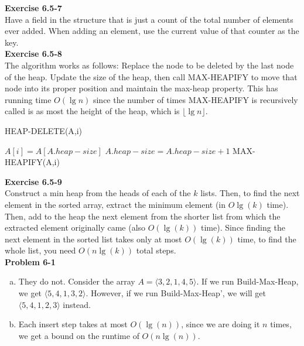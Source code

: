 \documentclass{article}
\begin{document}
\noindent\textbf{Exercise 6.5-7}\\

Have a field in the structure that is just a count of the total number of elements ever added. When adding an element, use the current value of that counter as the key.\\

\noindent\textbf{Exercise 6.5-8}\\

The algorithm works as follows:  Replace the node to be deleted by the last node of the heap.  Update the size of the heap, then call MAX-HEAPIFY to move that node into its proper position and maintain the max-heap property.  This has running time $O(\lg n)$ since the number of times MAX-HEAPIFY is recursively called is as most the height of the heap, which is $\lfloor \lg n \rfloor$.

\begin{algorithm}
\caption{HEAP-DELETE(A,i)}
\begin{algorithmic}[1]
\State $A[i] = A[A.heap-size]$ 
\State $A.heap-size = A.heap-size + 1$
\State MAX-HEAPIFY(A,i)
\end{algorithmic}
\end{algorithm}

\noindent\textbf{Exercise 6.5-9}\\

Construct a min heap from the heads of each of the $k$ lists. Then, to find the next element in the sorted array, extract the minimum element (in $O\lg(k)$ time). Then, add to the heap the next element from the shorter list from which the extracted element originally came (also $O(\lg(k))$ time). Since finding the next element in the sorted list takes only at most $O(\lg(k))$ time, to find the whole list, you need $O(n\lg(k))$ total steps. \\



\noindent\textbf{Problem 6-1}\\

\begin{enumerate}[a.]
\item
They do not. Consider the array $A =\langle 3,2,1,4,5\rangle$. If we run Build-Max-Heap, we get $\langle 5,4,1,3,2\rangle$. However, if we run Build-Max-Heap', we will get $\langle 5,4,1,2,3\rangle$ instead.
\item
Each insert step takes at most $O(\lg(n))$, since we are doing it $n$ times, we get a bound on the runtime of $O(n\lg(n))$.
\end{enumerate}
\end{document}
